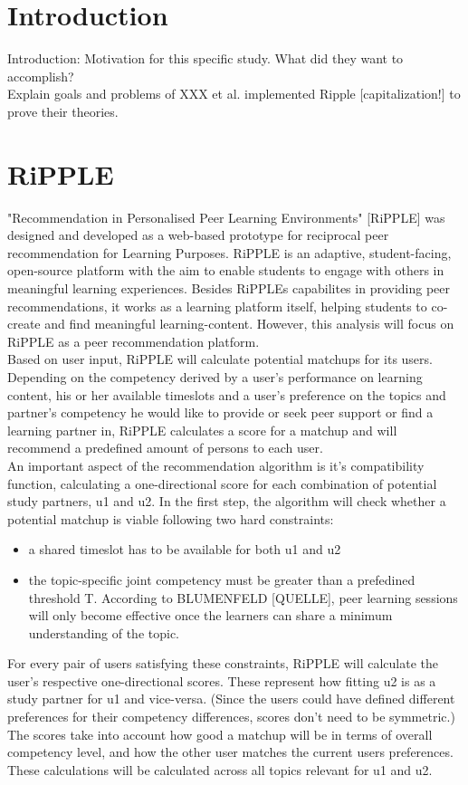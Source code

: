 \documentclass[nochapterpage,bigchapter,linedtoc,longdoc,colorback,accentcolor=tud3b]{tudreport}
\begin{document}
\section{Introduction}
Introduction: Motivation for this specific study. What did they want to accomplish?\\
Explain goals and problems of 
XXX et al. implemented Ripple [capitalization!] to prove their theories. 
\section{RiPPLE}
"Recommendation in Personalised Peer Learning Environments" [RiPPLE] was designed and developed as a web-based prototype for reciprocal peer recommendation for Learning Purposes. RiPPLE is an adaptive, student-facing, open-source platform with the aim to enable students to engage with others in meaningful learning experiences. Besides RiPPLEs capabilites in providing peer recommendations, it works as a learning platform itself, helping students to co-create and find meaningful learning-content. However, this analysis will focus on RiPPLE as a peer recommendation platform.\\
Based on user input, RiPPLE will calculate potential matchups for its users. Depending on the competency derived by a user's performance on learning content, his or her available timeslots and a user's preference on the topics and partner's competency he would like to provide or seek peer support or find a learning partner in, RiPPLE calculates a score for a matchup and will recommend a predefined amount of persons to each user.\\
An important aspect of the recommendation algorithm is it's compatibility function, calculating a one-directional score for each combination of potential study partners, u1 and u2. In the first step, the algorithm will check whether a potential matchup is viable following two hard constraints:
\begin{itemize}
	\item a shared timeslot has to be available for both u1 and u2
	\item the topic-specific joint competency must be greater than a prefedined threshold T. According to BLUMENFELD [QUELLE], peer learning sessions will only become effective once the learners can share a minimum understanding of the topic.
\end{itemize}
For every pair of users satisfying these constraints, RiPPLE will calculate the user's respective one-directional scores. These represent how fitting u2 is as a study partner for u1 and vice-versa. (Since the users could have defined different preferences for their competency differences, scores don't need to be symmetric.) The scores take into account how good a matchup will be in terms of overall competency level, and how the other user matches the current users preferences. These calculations will be calculated across all topics relevant for u1 and u2.\\
\end{document}
